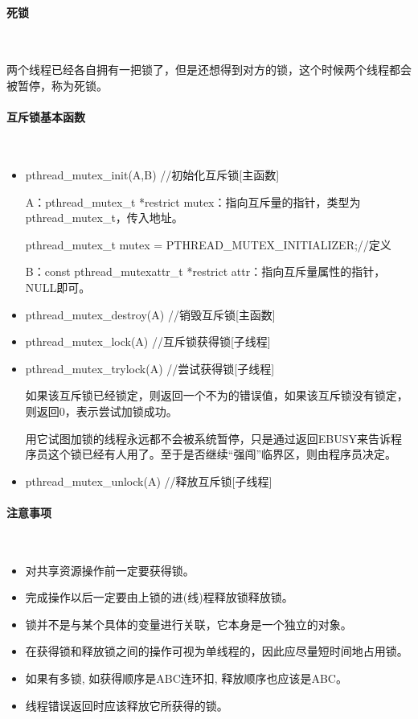 \documentclass[UTF8]{article}%
\begin{document}
\paragraph{死锁}~{}

两个线程已经各自拥有一把锁了，但是还想得到对方的锁，这个时候两个线程都会被暂停，称为死锁。

\paragraph{互斥锁基本函数}~{}

\begin{itemize}
    \item pthread\_mutex\_init(A,B) //初始化互斥锁[主函数]
    
    A：pthread\_mutex\_t *restrict mutex：指向互斥量的指针，类型为pthread\_mutex\_t，传入地址。

    pthread\_mutex\_t mutex = PTHREAD\_MUTEX\_INITIALIZER;//定义

    B：const pthread\_mutexattr\_t *restrict attr：指向互斥量属性的指针，NULL即可。

    \item pthread\_mutex\_destroy(A) //销毁互斥锁[主函数]
    \item pthread\_mutex\_lock(A) //互斥锁获得锁[子线程]
    \item pthread\_mutex\_trylock(A) //尝试获得锁[子线程]

    如果该互斥锁已经锁定，则返回一个不为的错误值，如果该互斥锁没有锁定，则返回0，表示尝试加锁成功。

    用它试图加锁的线程永远都不会被系统暂停，只是通过返回EBUSY来告诉程序员这个锁已经有人用了。至于是否继续“强闯”临界区，则由程序员决定。

    \item pthread\_mutex\_unlock(A) //释放互斥锁[子线程]
\end{itemize}

\paragraph{注意事项}~{}

\begin{itemize}
    \item 对共享资源操作前一定要获得锁。
    \item 完成操作以后一定要由上锁的进(线)程释放锁释放锁。
    \item 锁并不是与某个具体的变量进行关联，它本身是一个独立的对象。
    \item 在获得锁和释放锁之间的操作可视为单线程的，因此应尽量短时间地占用锁。
    \item 如果有多锁, 如获得顺序是ABC连环扣, 释放顺序也应该是ABC。
    \item 线程错误返回时应该释放它所获得的锁。
\end{itemize}
\end{document}
